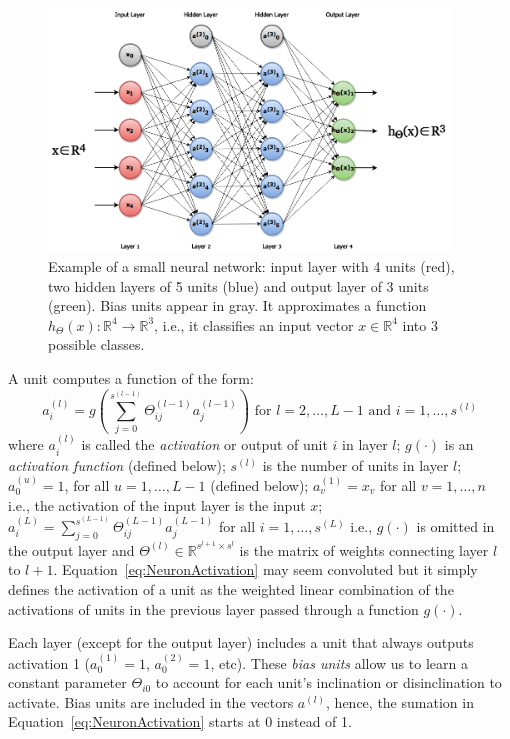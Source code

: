 \begin{figure}[h]
	\centering
	\includegraphics[width = 0.95\textwidth]{plots/neuralNetwork.png}
	\caption[Example of an artificial neural network]{Example of a small neural network: input layer with 4 units (red), two hidden layers of 5 units (blue) and output layer of 3 units (green). Bias units appear in gray. It approximates a function $h_\Theta(x): \mathbb{R}^4 \to \mathbb{R}^3$, i.e., it classifies an input vector $x \in \mathbb{R}^4$ into 3 possible classes.}
	\label{fig:NeuralNetwork}
\end{figure}

A unit computes a function of the form:
\begin{equation}
	a^{(l)}_i = g \left(\sum_{j=0}^{s^{(l-1)}} \Theta^{(l-1)}_{ij}a_j^{(l-1)}\right) \text{ for $l= 2,\dots,L-1$ and $i = 1,\dots,s^{(l)}$}
	\label{eq:NeuronActivation}
\end{equation}
where $a^{(l)}_i$ is called the \emph{activation} or output of unit $i$ in layer $l$;
$g(\cdot)$ is an \emph{activation function} (defined below);
$s^{(l)}$ is the number of units in layer $l$;
$a^{(u)}_0 = 1$, for all $u = 1, \ldots, L-1$ (defined below);
$a^{(1)}_v = x_v$ for all $v = 1, \ldots, n$ i.e., the activation of the input layer is the input $x$;
$a^{(L)}_i = \sum_{j=0}^{s^{(L-1)}} \Theta^{(L-1)}_{ij}a_j^{(L-1)}$ for all $i = 1,\dots,s^{(L)}$ i.e., $g(\cdot)$ is omitted in the output layer
and $\Theta^{(l)} \in \mathbb{R}^{s^{l+1} \times s^{l}} $ is the matrix of weights connecting layer $l$ to $l+1$. Equation~\ref{eq:NeuronActivation} may seem convoluted but it simply defines the activation of a unit as the weighted linear combination of the activations of units in the previous layer passed through a function $g(\cdot)$. 

Each layer (except for the output layer) includes a unit that always outputs activation 1 ($a^{(1)}_0 = 1$, $a^{(2)}_0 = 1$, etc). These \emph{bias units} allow us to learn a constant parameter $\Theta_{i 0}$ to account for each unit's inclination or disinclination to activate.
Bias units are included in the vectors $a^{(l)}$, hence, the sumation in Equation~\ref{eq:NeuronActivation} starts at 0 instead of 1.

